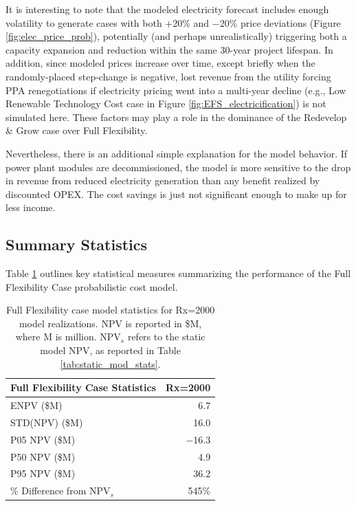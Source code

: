 It is interesting to note that the modeled electricity forecast includes enough volatility to generate cases with both +20\% and $-$20\% price deviations (Figure \ref{fig:elec_price_prob}), potentially (and perhaps unrealistically) triggering both a capacity expansion and reduction within the same 30-year project lifespan. In addition, since modeled prices increase over time, except briefly when the randomly-placed step-change is negative, lost revenue from the utility forcing PPA renegotiations if electricity pricing went into a multi-year decline (e.g., Low Renewable Technology Cost case in Figure \ref{fig:EFS_electricification}) is not simulated here. These factors may play a role in the dominance of the Redevelop \& Grow case over Full Flexibility.

Nevertheless, there is an additional simple explanation for the model behavior. If power plant modules are decommissioned, the model is more sensitive to the drop in revenue from reduced electricity generation than any benefit realized by discounted OPEX. The cost savings is just not significant enough to make up for less income.

\subsection{Summary Statistics}\label{ch6:reduce_stats}
Table \ref{tab:reduce_stats} outlines key statistical measures summarizing the performance of the Full Flexibility Case probabilistic cost model.

\begin{table}[H]
\centering
\begin{tabular}{|l|r|}
\hline
\textbf{Full Flexibility Case Statistics} & Rx=2000 \\ \hline
ENPV (\$M) & 6.7 \\ \hline
STD(NPV) (\$M) & 16.0 \\ \hline
P05 NPV (\$M) & $\boldsymbol{-}$16.3 \\ \hline
P50 NPV (\$M) & 4.9 \\ \hline
P95 NPV (\$M) & 36.2 \\ \hline
\% Difference from NPV$_{s}$ & 545\% \\ \hline
\end{tabular}
\caption[Full Flexibility Case statistics]{Full Flexibility case model statistics for Rx=2000 model realizations. NPV is reported in \$M, where M is million. NPV$_s$ refers to the static model NPV, as reported in Table \ref{tab:static_mod_stats}.}
\label{tab:reduce_stats}
\end{table}

